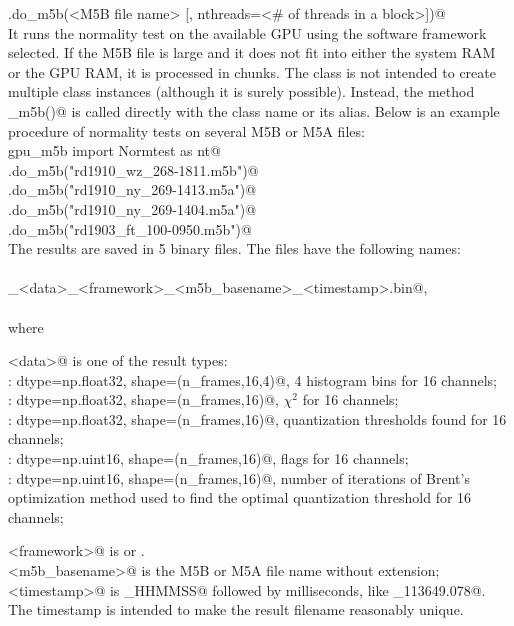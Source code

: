 \documentclass[letterpaper,twoside,12pt]{article}
\begin{document}
\noindent \verb@Normtest.do_m5b(<M5B file name> [, nthreads=<# of threads in a block>])@ \\

 It runs the normality test on the available GPU using the software framework selected. If the M5B file is large and it does not fit into either the system RAM or the GPU RAM, it is processed in chunks. The \verb@Normtest@ class is not intended to create multiple class instances (although it is surely possible). Instead, the method \verb@do_m5b()@ is called directly with the class name or its alias. Below is an example procedure of normality tests on several M5B or M5A files: \\

\noindent
\verb@from gpu_m5b import Normtest as nt@  \\
\verb@nt.do_m5b("rd1910_wz_268-1811.m5b")@ \\
\verb@nt.do_m5b("rd1910_ny_269-1413.m5a")@ \\
\verb@nt.do_m5b("rd1910_ny_269-1404.m5a")@ \\
\verb@nt.do_m5b("rd1903_ft_100-0950.m5b")@ \\

The results are saved in 5 binary files. The files have the following names: \\\\
\verb@nt_<data>_<framework>_<m5b_basename>_<timestamp>.bin@, \\\\
\noindent where

\noindent \verb@<data>@ is one of the result types: \\
\indent \verb@bin: dtype=np.float32, shape=(n_frames,16,4)@, 4 histogram bins for 16 channels; \\
\indent {}:   dtype=np.float32, shape=(n_frames,16)@, $\chi^2$ for 16 channels; \\
\indent \verb@thresh: dtype=np.float32, shape=(n_frames,16)@, quantization thresholds found
        for 16 channels; \\
\indent \verb@flag:   dtype=np.uint16, shape=(n_frames,16)@, flags for 16 channels; \\
\indent \verb@niter:  dtype=np.uint16, shape=(n_frames,16)@, number of iterations of Brent's
        optimization method used to find the optimal quantization threshold
        for 16 channels;

\noindent \verb@<framework>@ is \verb@cuda@ or \verb@opencl@. \\
\noindent \verb@<m5b_basename>@ is the M5B or M5A file name without extension; \\
\noindent \verb@<timestamp>@ is \verb@YYYYMMDD_HHMMSS@ followed by milliseconds, like _113649.078@. The timestamp is intended to make the result filename reasonably unique. \\
\end{document}

